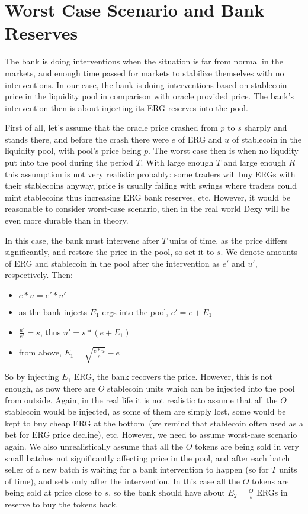 \documentclass{article}   %
\newcommand{\bc}{ERG}
\newcommand{\sct}{stablecoin}
\newcommand{\dx}{Dexy}
\begin{document}
\section{Worst Case Scenario and Bank Reserves}
\label{worst-case}

The bank is doing interventions when the situation is far from normal in the markets, and enough time passed for markets to stabilize themselves with no interventions. In our case, the bank is doing interventions based on stablecoin price in the liquidity pool in comparison with oracle provided price. The bank's intervention then is about injecting its \bc{} reserves into the pool.  

First of all, let's assume that the oracle price crashed from $p$ to $s$ sharply and stands there, and before the crash there were $e$ of \bc{} and $u$ of \sct{} in the liquidity pool, with pool's price being $p$. The worst case then is when no liqudity put into the pool during the period $T$. With large enough $T$ and large enough $R$ this assumption is not very realistic probably: some traders will buy \bc{}s with their \sct{}s anyway, price is usually failing with swings where traders could mint \sct{}s thus increasing \bc{} bank reserves, etc. However, it would be reasonable to consider worst-case scenario, then in the real world \dx{} will be even more durable than in theory. 

In this case, the bank must intervene after $T$ units of time, as the price differs significantly, and restore the price in the pool, so set it to $s$. We denote amounts of \bc{} and \sct{} in the pool after the intervention as $e'$ and $u'$, respectively. Then:

\begin{itemize}
  \item{} $e * u = e' * u'$
  \item{} as the bank injects $E_1$ ergs into the pool, $e' = e + E_1$
  \item{} $\frac{u'}{e'} = s$, thus $u' = s * (e + E_1)$ 
  \item{} from above, $E_1 = \sqrt{\frac{e * u}{s}} - e$
\end{itemize}

So by injecting $E_1$ \bc{}, the bank recovers the price. However, this is not enough, as now there are $O$ \sct{} units which can be injected into the pool from outside. 
Again, in the real life it is not realistic to assume that all the $O$ \sct{} would be injected, as some of them are simply lost, some would be kept to buy cheap ERG at the bottom~(we remind that \sct{} often used as a bet for \bc{} price decline), etc. However, we need to assume worst-case scenario again. We also unrealistically assume that all the $O$ tokens are being sold in very small batches not significantly affecting price in the pool, and after each batch seller of a new batch is waiting for a bank intervention to happen (so for $T$ units of time), and sells only after the intervention. In this case all the $O$ tokens are being sold at price close to $s$, so the bank should have about $E_2 = \frac{O}{s}$ \bc{}s in reserve to buy the tokens back.
\end{document}
